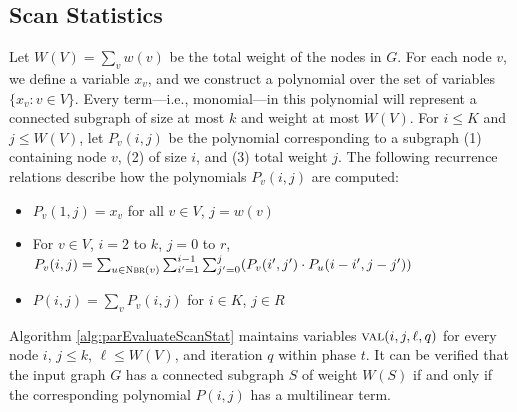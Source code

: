 \subsection{Scan Statistics}
\label{sec:apps-scanstat}
Let $W(V) = \sum_v{w(v)}$ be the total weight of the nodes in $G$. For each node $v$, we define a variable $x_v$, and we construct a polynomial over the set of variables $\{x_v: v \in V\}$. Every term---i.e., monomial---in this polynomial will represent a connected subgraph of size at most $k$ and weight at most $W(V)$.
For $i \leq K$ and $j \leq W(V)$, let $P_v(i,j)$ be the polynomial corresponding to a subgraph (1) containing node $v$, (2) of size $i$, and (3) total weight
$j$. The following recurrence relations describe how the polynomials $P_v(i, j)$ are computed:
\begin{itemize}
\item
$P_v(1, j) = x_v$ for all $v \in V$, $j = w(v)$
\item
For $v \in V$, $i = 2$ to $k$, $j = 0$ to $r$, 
$P_v(i,j) = \sum_{u \in \textsc{Nbr}(v)} \sum_{i' = 1}^{i-1}\sum_{j'=0}^j (P_v(i', j') \cdot P_u(i-i', j - j'))$
\item
$P(i,j) = \sum_v P_v(i,j)$ for $i \in K$, $j \in R$
\end{itemize}
Algorithm \ref{alg:parEvaluateScanStat} maintains variables $\textsc{val}(i, j, \ell, q)$ for every node $i$, $j\leq k$, $\ell \leq W(V)$, and iteration $q$ within phase $t$. It can be verified that the input graph $G$ has a connected subgraph $S$ of weight $W(S)$ if and only if the corresponding polynomial $P(i, j)$ has a multilinear term.


